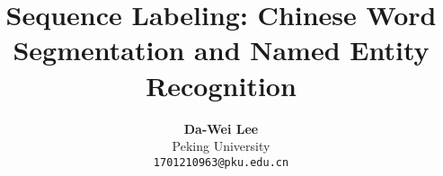 \documentclass[12pt]{article}
\title{\textbf{Sequence Labeling: Chinese Word Segmentation and Named Entity Recognition}}
\author{\textbf{Da-Wei Lee} \\
Peking University \\
{\tt 1701210963@pku.edu.cn}}
\date{\vspace{-5ex}}
\begin{document}
\maketitle
\begin{abstract}
  
\end{abstract}

\begin{multicols}{2}





\end{multicols}







\end{document}
